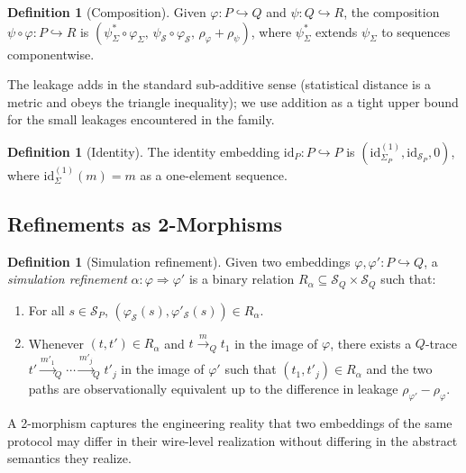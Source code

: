 \documentclass[11pt]{article}
\theoremstyle{definition}
\newtheorem{definition}[theorem]{Definition}
\theoremstyle{remark}
\begin{document}
\begin{definition}[Composition]
\label{def:composition}
Given $\varphi : P \hookrightarrow Q$ and $\psi : Q \hookrightarrow
R$, the composition $\psi \circ \varphi : P \hookrightarrow R$ is
$(\psi_\Sigma^* \circ \varphi_\Sigma,\, \psi_\mathcal{S} \circ
\varphi_\mathcal{S},\, \rho_\varphi + \rho_\psi)$, where
$\psi_\Sigma^*$ extends $\psi_\Sigma$ to sequences componentwise.
\end{definition}

The leakage adds in the standard sub-additive sense (statistical
distance is a metric and obeys the triangle inequality); we use
addition as a tight upper bound for the small leakages encountered
in the family.

\begin{definition}[Identity]
The identity embedding $\mathrm{id}_P : P \hookrightarrow P$ is
$(\mathrm{id}_{\Sigma_P}^{(1)}, \mathrm{id}_{\mathcal{S}_P}, 0)$,
where $\mathrm{id}_\Sigma^{(1)}(m) = m$ as a one-element sequence.
\end{definition}

\subsection{Refinements as 2-Morphisms}

\begin{definition}[Simulation refinement]
\label{def:refinement}
Given two embeddings $\varphi, \varphi' : P \hookrightarrow Q$, a
\emph{simulation refinement} $\alpha : \varphi \Rightarrow \varphi'$
is a binary relation
$R_\alpha \subseteq \mathcal{S}_Q \times \mathcal{S}_Q$ such that:
\begin{enumerate}
\item For all $s \in \mathcal{S}_P$,
$(\varphi_\mathcal{S}(s), \varphi'_\mathcal{S}(s)) \in R_\alpha$.
\item Whenever $(t, t') \in R_\alpha$ and $t \xrightarrow{m}_Q t_1$
in the image of $\varphi$, there exists a $Q$-trace
$t' \xrightarrow{m'_1}_Q \cdots \xrightarrow{m'_j}_Q t'_j$ in the
image of $\varphi'$ such that $(t_1, t'_j) \in R_\alpha$ and the
two paths are observationally equivalent up to the difference in
leakage $\rho_{\varphi'} - \rho_\varphi$.
\end{enumerate}
\end{definition}

A 2-morphism captures the engineering reality that two embeddings
of the same protocol may differ in their wire-level realization
without differing in the abstract semantics they realize.
\end{document}
